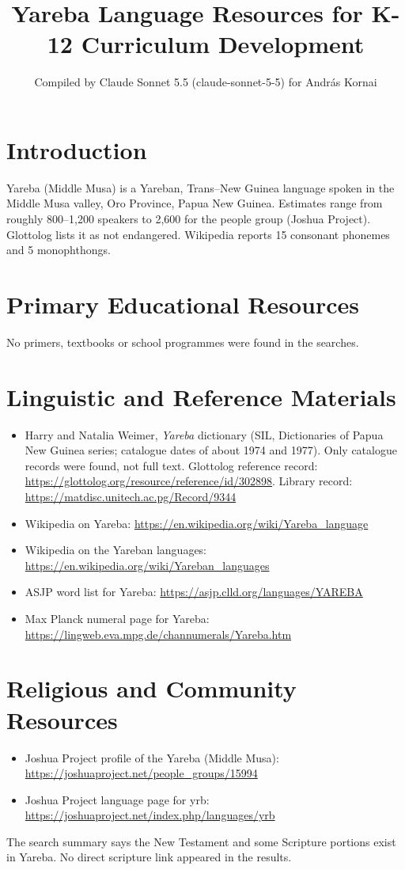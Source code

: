 \documentclass[12pt]{article}
\title{Yareba Language Resources for K-12 Curriculum Development}
\author{Compiled by Claude Sonnet 5.5 (claude-sonnet-5-5) for Andr\'as Kornai}
\date{}
\begin{document}
\maketitle

\section{Introduction}
Yareba (Middle Musa) is a Yareban, Trans--New Guinea language spoken in the Middle Musa valley, Oro Province, Papua New Guinea. Estimates range from roughly 800--1,200 speakers to 2,600 for the people group (Joshua Project). Glottolog lists it as not endangered. Wikipedia reports 15 consonant phonemes and 5 monophthongs.

\section{Primary Educational Resources}
No primers, textbooks or school programmes were found in the searches.

\section{Linguistic and Reference Materials}
\begin{itemize}
\item Harry and Natalia Weimer, \emph{Yareba} dictionary (SIL, Dictionaries of Papua New Guinea series; catalogue dates of about 1974 and 1977). Only catalogue records were found, not full text. Glottolog reference record: \url{https://glottolog.org/resource/reference/id/302898}. Library record: \url{https://matdisc.unitech.ac.pg/Record/9344}
\item Wikipedia on Yareba: \url{https://en.wikipedia.org/wiki/Yareba_language}
\item Wikipedia on the Yareban languages: \url{https://en.wikipedia.org/wiki/Yareban_languages}
\item ASJP word list for Yareba: \url{https://asjp.clld.org/languages/YAREBA}
\item Max Planck numeral page for Yareba: \url{https://lingweb.eva.mpg.de/channumerals/Yareba.htm}
\end{itemize}

\section{Religious and Community Resources}
\begin{itemize}
\item Joshua Project profile of the Yareba (Middle Musa): \url{https://joshuaproject.net/people_groups/15994}
\item Joshua Project language page for yrb: \url{https://joshuaproject.net/index.php/languages/yrb}
\end{itemize}
The search summary says the New Testament and some Scripture portions exist in Yareba. No direct scripture link appeared in the results.
\end{document}
